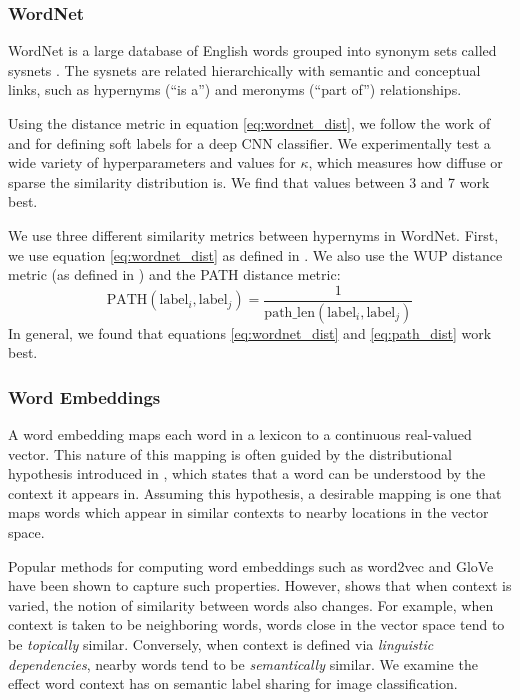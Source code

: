 \subsubsection{WordNet}

WordNet is a large database of English words grouped into synonym sets called
sysnets \cite{miller1995wordnet}.
The sysnets are related hierarchically with semantic and conceptual links, such
as hypernyms (``is a'') and meronyms (``part of'') relationships.

Using the distance metric in equation \ref{eq:wordnet_dist}, we follow the work
of \cite{fergus2010semantic} and \cite{zhao2011large} for defining soft labels
for a deep CNN classifier. We experimentally test a wide variety of
hyperparameters and values for $\kappa$, which measures how diffuse or sparse
the similarity distribution is. We find that values between 3 and 7 work best.

We use three different similarity metrics between hypernyms in WordNet.
First, we use equation \ref{eq:wordnet_dist} as defined in \cite{zhao2011large}.
We also use the WUP distance metric (as defined in
\cite{budanitsky2006evaluating}) and the PATH distance metric:
\begin{equation}
\label{eq:path_dist}
\mathrm{PATH}(\mathrm{label}_i, \mathrm{label}_j) =
  \frac{1}{\mathrm{path\_len}(\mathrm{label}_i, \mathrm{label}_j)}
\end{equation}
In general, we found that equations \ref{eq:wordnet_dist} and \ref{eq:path_dist}
work best.


\subsubsection{Word Embeddings} \label{word2vec}

A word embedding maps each word in a lexicon to a continuous
real-valued vector. This nature of this mapping is often guided by the
distributional hypothesis introduced in
\cite{harris1954distributional}, which states that a word can be
understood by the context it appears in. Assuming this hypothesis, a
desirable mapping is one that maps words which appear in similar
contexts to nearby locations in the vector space.

Popular methods for computing word embeddings such as word2vec
\cite{mikolov2013distributed} and GloVe \cite{pennington2014glove} have been
shown to capture such properties.  However, \cite{levy2014dependency} shows that
when context is varied, the notion of similarity between words also changes. For
example, when context is taken to be neighboring words, words close in the
vector space tend to be \emph{topically} similar. Conversely, when context is
defined via \emph{linguistic dependencies}, nearby words tend to be
\emph{semantically} similar. We examine the effect word context has on semantic
label sharing for image classification.

